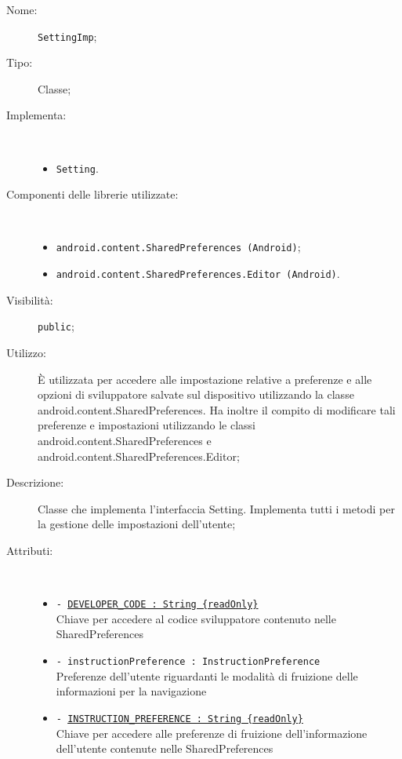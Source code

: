 \documentclass[../DefinizioneDiProdotto.tex]{subfiles}
\begin{document}
\begin{description}
	\item[Nome:] \texttt{SettingImp};
	\item[Tipo:] Classe;
	\item[Implementa:] \
	\begin{itemize}
		\item \texttt{Setting}.
		
	\end{itemize}
	\item[Componenti delle librerie utilizzate:] \
	\begin{itemize}
		\item \texttt{android.content.SharedPreferences (Android)};
		
		\item \texttt{android.content.SharedPreferences.Editor (Android)}.
		
	\end{itemize}
	\item[Visibilità:] \texttt{public};
	\item[Utilizzo:] È utilizzata per accedere alle impostazione relative a preferenze e alle opzioni di sviluppatore salvate sul dispositivo utilizzando la classe android.content.SharedPreferences. Ha inoltre il compito di modificare tali preferenze e impostazioni utilizzando le classi android.content.SharedPreferences e android.content.SharedPreferences.Editor;
	\item[Descrizione:] Classe che implementa l'interfaccia Setting. Implementa tutti i metodi per la gestione delle impostazioni dell'utente;
	\item[Attributi:] \
	\begin{itemize}
		\item \texttt{- \underline{DEVELOPER\_CODE : String \{readOnly\}}}\\
		Chiave per accedere al codice sviluppatore contenuto nelle SharedPreferences
		
		\item \texttt{- instructionPreference : InstructionPreference}\\
		Preferenze dell'utente riguardanti le modalità di fruizione delle informazioni per la navigazione
		
		\item \texttt{- \underline{INSTRUCTION\_PREFERENCE : String \{readOnly\}}}\\
		Chiave per accedere alle preferenze di fruizione dell'informazione dell'utente contenute nelle SharedPreferences
		

\end{itemize}
\end{description}
\end{document}
